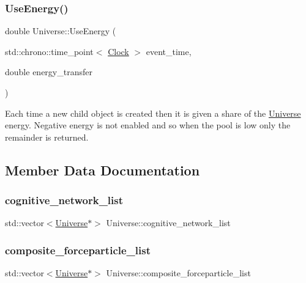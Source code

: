 \mbox{\label{classUniverse_a63e878aaf03f1800b255e9a089a72a8b}} 
\subsubsection{\texorpdfstring{Use\+Energy()}{UseEnergy()}}
{\footnotesize\ttfamily double Universe\+::\+Use\+Energy (\begin{DoxyParamCaption}\item[{std\+::chrono\+::time\+\_\+point$<$ \mbox{\hyperlink{universe_8h_a0ef8d951d1ca5ab3cfaf7ab4c7a6fd80}{Clock}} $>$}]{event\+\_\+time,  }\item[{double}]{energy\+\_\+transfer }\end{DoxyParamCaption})}

Each time a new child object is created then it is given a share of the \mbox{\hyperlink{classUniverse}{Universe}} energy. Negative energy is not enabled and so when the pool is low only the remainder is returned.

\subsection{Member Data Documentation}
\mbox{\label{classUniverse_a7a0e9796ff0d650a8b1fbde5fa5b761f}} 
\subsubsection{\texorpdfstring{cognitive\+\_\+network\+\_\+list}{cognitive\_network\_list}}
{\footnotesize\ttfamily std\+::vector$<$\mbox{\hyperlink{classUniverse}{Universe}}$\ast$$>$ Universe\+::cognitive\+\_\+network\+\_\+list\hspace{0.3cm}{\ttfamily [protected]}}

\mbox{\label{classUniverse_ae9795d06e406c4322637825aa545aa2f}} 
\subsubsection{\texorpdfstring{composite\+\_\+forceparticle\+\_\+list}{composite\_forceparticle\_list}}
{\footnotesize\ttfamily std\+::vector$<$\mbox{\hyperlink{classUniverse}{Universe}}$\ast$$>$ Universe\+::composite\+\_\+forceparticle\+\_\+list\hspace{0.3cm}{\ttfamily [protected]}}

